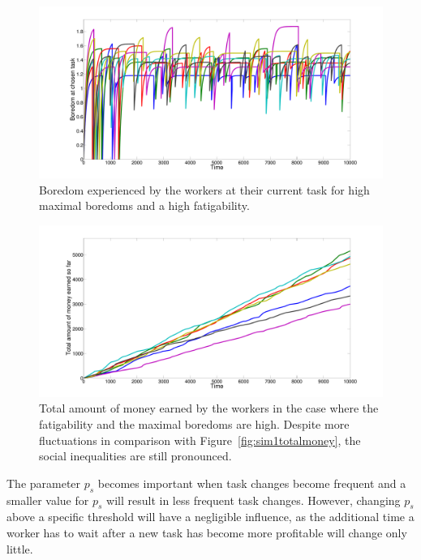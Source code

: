 \begin{figure}[h!]
	\centering
	\includegraphics[width=\textwidth]{../figures/moreboredom2.pdf}
	\caption{Boredom experienced by the workers at their current task for high maximal boredoms and a high fatigability.}
	\label{fig:moreboredom2}
\end{figure}

\begin{figure}[h!]
	\centering
	\includegraphics[width=\textwidth]{../figures/moreboredom3.pdf}
	\caption{Total amount of money earned by the workers in the case where the fatigability and the maximal boredoms are high. Despite more fluctuations in comparison with Figure~\ref{fig:sim1totalmoney}, the social inequalities are still pronounced.}
	\label{fig:moreboredom3}
\end{figure}

The parameter $p_s$ becomes important when task changes become frequent and a smaller value for $p_s$ will result in less frequent task changes. However, changing $p_s$ above a specific threshold will have a negligible influence, as the additional time a worker has to wait after a new task has become more profitable will change only little.
